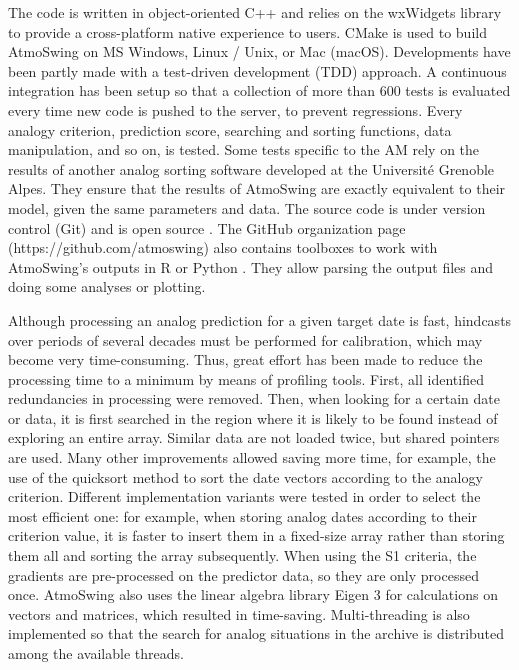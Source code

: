 \documentclass[review]{elsarticle}
\begin{document}
The code is written in object-oriented C++ and relies on the wxWidgets \citep{Smart2006} library to provide a cross-platform native experience to users. CMake is used to build AtmoSwing on MS Windows, Linux / Unix, or Mac (macOS). Developments have been partly made with a test-driven development (TDD) approach. A continuous integration has been setup so that a collection of more than 600 tests is evaluated every time new code is pushed to the server, to prevent regressions. Every analogy criterion, prediction score, searching and sorting functions, data manipulation, and so on, is tested. Some tests specific to the AM rely on the results of another analog sorting software developed at the Universit\'{e} Grenoble Alpes. They ensure that the results of AtmoSwing are exactly equivalent to their model, given the same parameters and data. The source code is under version control (Git) and is open source \citep[on GitHub, www.atmoswing.org,][]{Horton2018c}. The GitHub organization page (https://github.com/atmoswing) also contains toolboxes to work with AtmoSwing's outputs in R \citep{Horton2018d} or Python \citep{Horton2018e}. They allow parsing the output files and doing some analyses or plotting.

Although processing an analog prediction for a given target date is fast, hindcasts over periods of several decades must be performed for calibration, which may become very time-consuming. Thus, great effort has been made to reduce the processing time to a minimum by means of profiling tools. First, all identified redundancies in processing were removed. Then, when looking for a certain date or data, it is first searched in the region where it is likely to be found instead of exploring an entire array. Similar data are not loaded twice, but shared pointers are used. Many other improvements allowed saving more time, for example, the use of the quicksort method \citep{Hoare1962a} to sort the date vectors according to the analogy criterion. Different implementation variants were tested in order to select the most efficient one: for example, when storing analog dates according to their criterion value, it is faster to insert them in a fixed-size array rather than storing them all and sorting the array subsequently. When using the S1 criteria, the gradients are pre-processed on the predictor data, so they are only processed once. AtmoSwing also uses the linear algebra library Eigen 3 \citep{Guennebaud2010} for calculations on vectors and matrices, which resulted in time-saving. Multi-threading is also implemented so that the search for analog situations in the archive is distributed among the available threads. 
\end{document}
